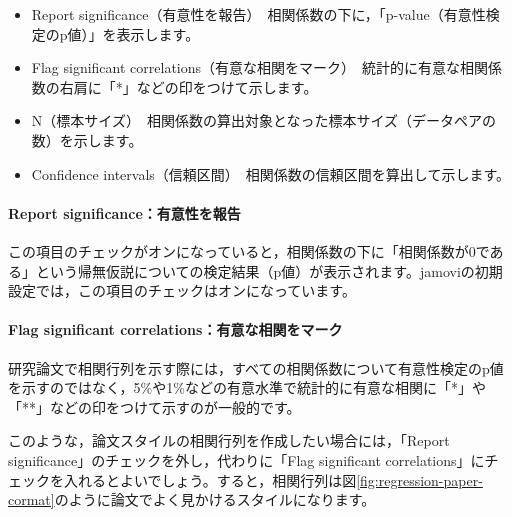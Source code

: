 \documentclass[
  12pt,
  a5jpaper,
  lualatex, ja=standard]{bxjsbook}
\providecommand{\tightlist}{%
  \setlength{\itemsep}{0pt}\setlength{\parskip}{0pt}}
\newenvironment{jmvsettings}{%
	\begin{center}%
	\begin{tcolorbox}[%
		title=設定項目,
		colframe=gmoji,
		colbacktitle=gmoji,
		colback=gmoji!2!white,
		breakable,
		width=.9\textwidth,
		]\small\addtolength{\leftmargini}{-3\labelsep}%
	}%
	{\end{tcolorbox}\end{center}}
\begin{document}
\begin{jmvsettings}

\begin{itemize}
\tightlist
\item
  Report significance（有意性を報告）　相関係数の下に，「p-value（有意性検定のp値）」を表示します。
\item
  Flag significant correlations（有意な相関をマーク）　統計的に有意な相関係数の右肩に「*」などの印をつけて示します。
\item
  N（標本サイズ）　相関係数の算出対象となった標本サイズ（データペアの数）を示します。
\item
  Confidence intervals（信頼区間）　相関係数の信頼区間を算出して示します。
\end{itemize}

\end{jmvsettings}

\hypertarget{report-significanceux6709ux610fux6027ux3092ux5831ux544a}{%
\paragraph*{Report significance：有意性を報告}\label{report-significanceux6709ux610fux6027ux3092ux5831ux544a}}

この項目のチェックがオンになっていると，相関係数の下に「相関係数が0である」という帰無仮説についての検定結果（p値）が表示されます。jamoviの初期設定では，この項目のチェックはオンになっています。

\hypertarget{flag-significant-correlationsux6709ux610fux306aux76f8ux95a2ux3092ux30deux30fcux30af}{%
\paragraph*{Flag significant correlations：有意な相関をマーク}\label{flag-significant-correlationsux6709ux610fux306aux76f8ux95a2ux3092ux30deux30fcux30af}}

研究論文で相関行列を示す際には，すべての相関係数について有意性検定のp値を示すのではなく，5\%や1\%などの有意水準で統計的に有意な相関に「*」や「**」などの印をつけて示すのが一般的です。

このような，論文スタイルの相関行列を作成したい場合には，「Report significance」のチェックを外し，代わりに「Flag significant correlations」にチェックを入れるとよいでしょう。すると，相関行列は図\ref{fig:regression-paper-cormat}のように論文でよく見かけるスタイルになります。
\end{document}

